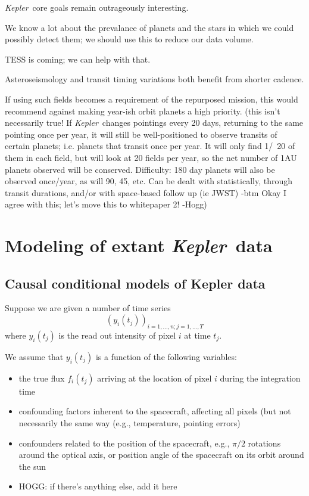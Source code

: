 \documentclass[letterpaper,12pt,preprint]{aastex}
\newcommand{\observatory}[1]{\textsl{#1}}
\newcommand{\kepler}{\observatory{Kepler}}
\newcommand{\Kepler}{\kepler}
\begin{document}
\Kepler\ core goals remain outrageously interesting.

We know a lot about the prevalance of planets and the stars in which
we could possibly detect them; we should use this to reduce our data
volume.

TESS is coming; we can help with that.

Asteroseismology and transit timing variations both benefit from
shorter cadence.

If using such fields becomes a requirement of the repurposed mission,
  this would recommend against making year-ish orbit planets a high priority.
  (this isn't necessarily true! If \Kepler\ changes pointings every 20 days, returning to the same pointing once
  per year, it will still be well-positioned to observe transits of certain planets; i.e. planets that transit
  once per year. It will only find 1/~20 of them in each field, but will look at 20 fields per year, so the
  net number of 1AU planets observed will be conserved. Difficulty: 180 day planets will also be observed once/year,
  as will 90, 45, etc. Can be dealt with statistically, through transit durations, and/or with space-based follow up
  (ie JWST) -btm  Okay I agree with this; let's move this to whitepaper 2! -Hogg)

\section{Modeling of extant \Kepler\ data}\label{sec:extant}

\subsection{Causal conditional models of Kepler data}

Suppose we are given a number of time series
$$(y_i(t_j))_{i=1,\dots,n; j=1,\dots,T}$$
where $y_i(t_j)$ is the read out intensity of pixel $i$ at time $t_j$.

We assume that $y_i(t_j)$ is a function of the following variables:
\begin{itemize}
\item
the true flux $f_i(t_j)$ arriving at the location of pixel $i$ during the
integration time
\item
confounding factors inherent to the spacecraft, affecting all pixels (but not
necessarily the same way (e.g., temperature, pointing errors)
\item
confounders related to the position of the spacecraft, e.g., $\pi/2$ rotations
around the optical axis, or position angle of the spacecraft on its orbit
around the sun
\item
HOGG: if there's anything else, add it here
\end{itemize}
\end{document}
